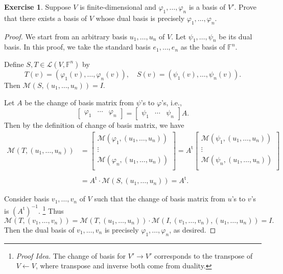 \documentclass[nofonts,colorlinks]{tufte-handout}
\theoremstyle{plain} %
\theoremstyle{definition}
\newtheorem{exer}[thm]{Exercise}
\theoremstyle{remark}
\def\idea{\textit{\color[rgb]{0,0,.55}Proof Idea. }}
\newcommand{\bra}[1]{\mathopen{}\left(#1\right)}
\renewcommand{\phi}{\varphi}
\newcommand{\F}{\mathbb{F}}
\renewcommand{\L}{\mathcal{L}}
\newcommand{\M}{\mathcal{M}}
\renewcommand{\intercal}{\mathrm{t}}
\begin{document}
\begin{exer}
	Suppose $V$ is finite-dimensional and $\phi_1,\dots,\phi_n$ is a basis of $V'$. Prove that there exists a basis of $V$ whose dual basis is precisely $\phi_1,\dots,\phi_n$.
\end{exer}
\begin{proof}
	We start from an arbitrary basis $u_1,\dots,u_n$ of $V$. Let $\psi_1,\dots,\psi_n$ be its dual basis. In this proof, we take the standard basis $e_1,\dots,e_n$ as the basis of $\F^n$.
	
	Define $S,T\in\L\bra{V,\F^n}$ by
	\[T(v)=\bra{\phi_1(v),\dots,\phi_n(v)},\quad S(v)=\bra{\psi_1(v),\dots,\psi_n(v)}.\]
	Then $\M\bra{S,\bra{u_1,\dots,u_n}}=I$.
	
	Let $A$ be the change of basis matrix from $\psi$'s to $\phi$'s, i.e.,
	\[\begin{bmatrix}\phi_1&\cdots&\phi_n\end{bmatrix}=\begin{bmatrix}\psi_1&\cdots&\psi_n\end{bmatrix}A.\]
	Then by the definition of change of basis matrix, we have
	\begin{align*}
		\M\bra{T,\bra{u_1,\dots,u_n}}&=\begin{bmatrix}
			\M\bra{\phi_1,\bra{u_1,\dots,u_n}}\\
			\vdots\\
			\M\bra{\phi_n,\bra{u_1,\dots,u_n}}\\
		\end{bmatrix}
		=A^\intercal\begin{bmatrix}
			\M\bra{\psi_1,\bra{u_1,\dots,u_n}}\\
			\vdots\\
			\M\bra{\psi_n,\bra{u_1,\dots,u_n}}\\
		\end{bmatrix}\\\\
		&=A^\intercal\cdot\M\bra{S,\bra{u_1,\dots,u_n}}=A^\intercal.
	\end{align*}

	Consider basis $v_1,\dots,v_n$ of $V$ such that the change of basis matrix from $u$'s to $v$'s is $\bra{A^\intercal}^{-1}$.%
    \footnote{\idea The change of basis for $V'\to V'$ corresponds to the transpose of $V\leftarrow V$, where transpose and inverse both come from duality.}
	Thus
	\[\M\bra{T,\bra{v_1,\dots,v_n}}=\M\bra{T,\bra{u_1,\dots,u_n}}\cdot\M\bra{I,\bra{v_1,\dots,v_n},\bra{u_1,\dots,u_n}}=I.\]
	Then the dual basis of $v_1,\dots,v_n$ is precisely $\phi_1,\dots,\phi_n$, as desired.
\end{proof}
\end{document}
